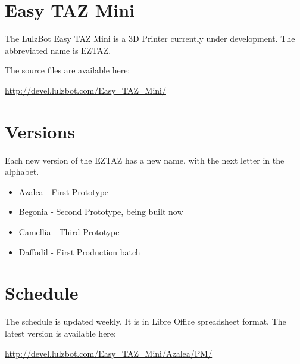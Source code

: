 %
%
%
%
%

\section{Easy TAZ Mini}
The LulzBot Easy TAZ Mini is a 3D Printer currently under development. The
abbreviated name is EZTAZ.

The source files are available here:

\href{http://devel.lulzbot.com/Easy\_TAZ\_Mini/}{http://devel.lulzbot.com/Easy\_TAZ\_Mini/}

\section{Versions}
Each new version of the EZTAZ has a new name, with the next letter in the alphabet.

\begin{itemize}
  \item Azalea - First Prototype
  \item Begonia - Second Prototype, being built now
  \item Camellia - Third Prototype
  \item Daffodil - First Production batch
\end{itemize}


\section{Schedule}
The schedule is updated weekly. It is in Libre Office spreadsheet format. The
latest version is available here:

\href{http://devel.lulzbot.com/Easy\_TAZ\_Mini/Azalea/PM/}{http://devel.lulzbot.com/Easy\_TAZ\_Mini/Azalea/PM/}


